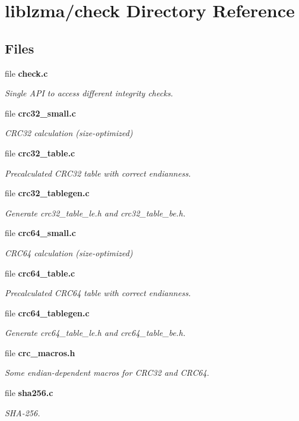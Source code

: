 \section{liblzma/check Directory Reference}
\label{dir_32e8ef00be12127410478e93c5f07fec}
\subsection*{Files}
\begin{DoxyCompactItemize}
\item 
file \textbf{ check.\+c}
\begin{DoxyCompactList}\small\item\em Single A\+PI to access different integrity checks. \end{DoxyCompactList}\item 
file \textbf{ crc32\+\_\+small.\+c}
\begin{DoxyCompactList}\small\item\em C\+R\+C32 calculation (size-\/optimized) \end{DoxyCompactList}\item 
file \textbf{ crc32\+\_\+table.\+c}
\begin{DoxyCompactList}\small\item\em Precalculated C\+R\+C32 table with correct endianness. \end{DoxyCompactList}\item 
file \textbf{ crc32\+\_\+tablegen.\+c}
\begin{DoxyCompactList}\small\item\em Generate crc32\+\_\+table\+\_\+le.\+h and crc32\+\_\+table\+\_\+be.\+h. \end{DoxyCompactList}\item 
file \textbf{ crc64\+\_\+small.\+c}
\begin{DoxyCompactList}\small\item\em C\+R\+C64 calculation (size-\/optimized) \end{DoxyCompactList}\item 
file \textbf{ crc64\+\_\+table.\+c}
\begin{DoxyCompactList}\small\item\em Precalculated C\+R\+C64 table with correct endianness. \end{DoxyCompactList}\item 
file \textbf{ crc64\+\_\+tablegen.\+c}
\begin{DoxyCompactList}\small\item\em Generate crc64\+\_\+table\+\_\+le.\+h and crc64\+\_\+table\+\_\+be.\+h. \end{DoxyCompactList}\item 
file \textbf{ crc\+\_\+macros.\+h}
\begin{DoxyCompactList}\small\item\em Some endian-\/dependent macros for C\+R\+C32 and C\+R\+C64. \end{DoxyCompactList}\item 
file \textbf{ sha256.\+c}
\begin{DoxyCompactList}\small\item\em S\+H\+A-\/256. \end{DoxyCompactList}\end{DoxyCompactItemize}
